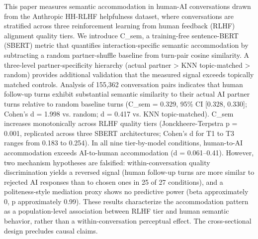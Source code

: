 
This paper measures semantic accommodation in human-AI conversations drawn from the Anthropic HH-RLHF helpfulness dataset, where conversations are stratified across three reinforcement learning from human feedback (RLHF) alignment quality tiers. We introduce C\_sem, a training-free sentence-BERT (SBERT) metric that quantifies interaction-specific semantic accommodation by subtracting a random partner-shuffle baseline from turn-pair cosine similarity. A three-level partner-specificity hierarchy (actual partner > KNN topic-matched > random) provides additional validation that the measured signal exceeds topically matched controls. Analysis of 155,362 conversation pairs indicates that human follow-up turns exhibit substantial semantic similarity to their actual AI partner turns relative to random baseline turns (C\_sem = 0.329, 95\% CI [0.328, 0.330]; Cohen's d = 1.998 vs. random; d = 0.417 vs. KNN topic-matched). C\_sem increases monotonically across RLHF quality tiers (Jonckheere-Terpstra p = 0.001, replicated across three SBERT architectures; Cohen's d for T1 to T3 ranges from 0.183 to 0.254). In all nine tier-by-model conditions, human-to-AI accommodation exceeds AI-to-human accommodation (d = 0.061--0.41). However, two mechanism hypotheses are falsified: within-conversation quality discrimination yields a reversed signal (human follow-up turns are more similar to rejected AI responses than to chosen ones in 25 of 27 conditions), and a politeness-style mediation proxy shows no predictive power (beta approximately 0, p approximately 0.99). These results characterize the accommodation pattern as a population-level association between RLHF tier and human semantic behavior, rather than a within-conversation perceptual effect. The cross-sectional design precludes causal claims.
